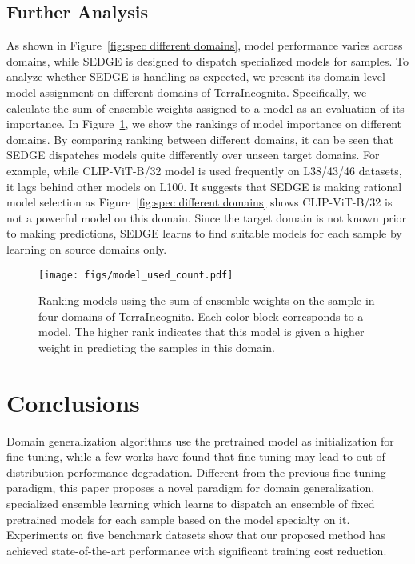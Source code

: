 \documentclass{article}
\newcommand{\method}{\textsc{SEDGE}\xspace}
\begin{document}
\subsection{Further Analysis}


As shown in Figure~\ref{fig:spec different domains}, model performance varies across domains, while \method is designed to dispatch specialized models for samples.
To analyze whether \method is handling as expected, we present its domain-level model assignment on different domains of TerraIncognita.
Specifically, we calculate the sum of ensemble weights assigned to a model as an evaluation of its importance.
In Figure~\ref{fig:model used count}, we show the rankings of model importance on different domains.
By comparing ranking between different domains, it can be seen that \method dispatches models quite differently over unseen target domains.
For example, while CLIP-ViT-B/32 model is used frequently on L38/43/46 datasets, it lags behind other models on L100.
It suggests that \method is making rational model selection as Figure~\ref{fig:spec different domains} shows CLIP-ViT-B/32 is not a powerful model on this domain.
Since the target domain is not known prior to making predictions, \method learns to find suitable models for each sample by learning on source domains only. 



\begin{figure}
    \begin{center}
    \texttt{[image: figs/model\_used\_count.pdf]}
  \end{center}
  \caption{Ranking models using the sum of ensemble weights on the sample in four domains of TerraIncognita. Each color block corresponds to a model. The higher rank indicates that this model is given a higher weight in predicting the samples in this domain.}
  \label{fig:model used count}
\end{figure}



\section{Conclusions}

Domain generalization algorithms use the pretrained model as initialization for fine-tuning, while a few works have found that fine-tuning may lead to out-of-distribution performance degradation.
Different from the previous fine-tuning paradigm,
this paper proposes a novel paradigm for domain generalization, specialized ensemble learning which learns to dispatch an ensemble of fixed pretrained models for each sample based on the model specialty on it.
Experiments on five benchmark datasets show that our proposed method has achieved state-of-the-art performance with significant training cost reduction.




\end{document}
